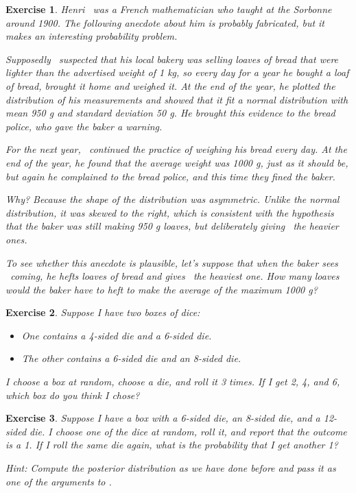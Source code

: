 \documentclass[12pt]{book}
\theoremstyle{exercise}
\newtheorem{exercise}{Exercise}[chapter]
\begin{document}
\begin{exercise}
Henri \Poincare~was a French mathematician who taught at the Sorbonne around 1900. The following anecdote about him is probably fabricated, but it makes an interesting probability problem.

Supposedly \Poincare~suspected that his local bakery was selling loaves of bread that were lighter than the advertised weight of 1 kg, so every day for a year he bought a loaf of bread, brought it home and weighed it. At the end of the year, he plotted the distribution of his measurements and showed that it fit a normal distribution with mean 950 g and standard deviation 50 g. He brought this evidence to the bread police, who gave the baker a warning.

For the next year, \Poincare~continued the practice of weighing his bread every day. At the end of the year, he found that the average weight was 1000 g, just as it should be, but again he complained to the bread police, and this time they fined the baker.

Why? Because the shape of the distribution was asymmetric. Unlike the normal distribution, it was skewed to the right, which is consistent with the hypothesis that the baker was still making 950 g loaves, but deliberately giving \Poincare~the heavier ones.

To see whether this anecdote is plausible, let's suppose that when the baker sees \Poincare~coming, he hefts  loaves of bread and gives \Poincare~the heaviest one.  How many loaves would the baker have to heft to make the average of the maximum 1000 g?
\end{exercise}


\begin{exercise}
Suppose I have two boxes of dice:

\begin{itemize}
\item One contains a 4-sided die and a 6-sided die.

\item The other contains a 6-sided die and an 8-sided die.
\end{itemize}

I choose a box at random, choose a die, and roll it 3 times.  If I get 2, 4, and 6, which box do you think I chose?
\end{exercise}


\begin{exercise}
Suppose I have a box with a 6-sided die, an 8-sided die, and a 12-sided die.
I choose one of the dice at random, roll it, and report that the outcome is a 1.
If I roll the same die again, what is the probability that I get another 1?

Hint: Compute the posterior distribution as we have done before and pass it as one of the arguments to .
\end{exercise}
\end{document}
